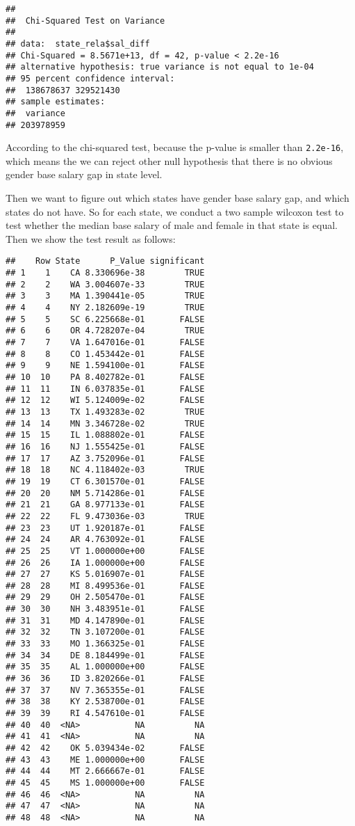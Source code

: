 \documentclass[
]{article}
\begin{document}
\begin{verbatim}
## 
##  Chi-Squared Test on Variance
## 
## data:  state_rela$sal_diff
## Chi-Squared = 8.5671e+13, df = 42, p-value < 2.2e-16
## alternative hypothesis: true variance is not equal to 1e-04
## 95 percent confidence interval:
##  138678637 329521430
## sample estimates:
##  variance 
## 203978959
\end{verbatim}

According to the chi-squared test, because the p-value is smaller than
\texttt{2.2e-16}, which means the we can reject other null hypothesis
that there is no obvious gender base salary gap in state level.

Then we want to figure out which states have gender base salary gap, and
which states do not have. So for each state, we conduct a two sample
wilcoxon test to test whether the median base salary of male and female
in that state is equal. Then we show the test result as follows:

\begin{verbatim}
##    Row State      P_Value significant
## 1    1    CA 8.330696e-38        TRUE
## 2    2    WA 3.004607e-33        TRUE
## 3    3    MA 1.390441e-05        TRUE
## 4    4    NY 2.182609e-19        TRUE
## 5    5    SC 6.225668e-01       FALSE
## 6    6    OR 4.728207e-04        TRUE
## 7    7    VA 1.647016e-01       FALSE
## 8    8    CO 1.453442e-01       FALSE
## 9    9    NE 1.594100e-01       FALSE
## 10  10    PA 8.402782e-01       FALSE
## 11  11    IN 6.037835e-01       FALSE
## 12  12    WI 5.124009e-02       FALSE
## 13  13    TX 1.493283e-02        TRUE
## 14  14    MN 3.346728e-02        TRUE
## 15  15    IL 1.088802e-01       FALSE
## 16  16    NJ 1.555425e-01       FALSE
## 17  17    AZ 3.752096e-01       FALSE
## 18  18    NC 4.118402e-03        TRUE
## 19  19    CT 6.301570e-01       FALSE
## 20  20    NM 5.714286e-01       FALSE
## 21  21    GA 8.977133e-01       FALSE
## 22  22    FL 9.473036e-03        TRUE
## 23  23    UT 1.920187e-01       FALSE
## 24  24    AR 4.763092e-01       FALSE
## 25  25    VT 1.000000e+00       FALSE
## 26  26    IA 1.000000e+00       FALSE
## 27  27    KS 5.016907e-01       FALSE
## 28  28    MI 8.499536e-01       FALSE
## 29  29    OH 2.505470e-01       FALSE
## 30  30    NH 3.483951e-01       FALSE
## 31  31    MD 4.147890e-01       FALSE
## 32  32    TN 3.107200e-01       FALSE
## 33  33    MO 1.366325e-01       FALSE
## 34  34    DE 8.184499e-01       FALSE
## 35  35    AL 1.000000e+00       FALSE
## 36  36    ID 3.820266e-01       FALSE
## 37  37    NV 7.365355e-01       FALSE
## 38  38    KY 2.538700e-01       FALSE
## 39  39    RI 4.547610e-01       FALSE
## 40  40  <NA>           NA          NA
## 41  41  <NA>           NA          NA
## 42  42    OK 5.039434e-02       FALSE
## 43  43    ME 1.000000e+00       FALSE
## 44  44    MT 2.666667e-01       FALSE
## 45  45    MS 1.000000e+00       FALSE
## 46  46  <NA>           NA          NA
## 47  47  <NA>           NA          NA
## 48  48  <NA>           NA          NA
\end{verbatim}
\end{document}
